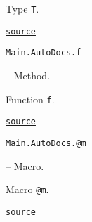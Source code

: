 \begin{adjustwidth}{2em}{0pt}

Type \texttt{T}.



\href{https://example.org/Repository.jl/blob/test/examples/make.jl#L91-91}{\texttt{source}}


\end{adjustwidth}
\hypertarget{14053004641171891989}{\texttt{Main.AutoDocs.f}}  -- {Method.}

\begin{adjustwidth}{2em}{0pt}

Function \texttt{f}.



\href{https://example.org/Repository.jl/blob/test/examples/make.jl#L85-85}{\texttt{source}}


\end{adjustwidth}
\hypertarget{7256264955516068825}{\texttt{Main.AutoDocs.@m}}  -- {Macro.}

\begin{adjustwidth}{2em}{0pt}

Macro \texttt{@m}.



\href{https://example.org/Repository.jl/blob/test/examples/make.jl#L94-94}{\texttt{source}}


\end{adjustwidth}


